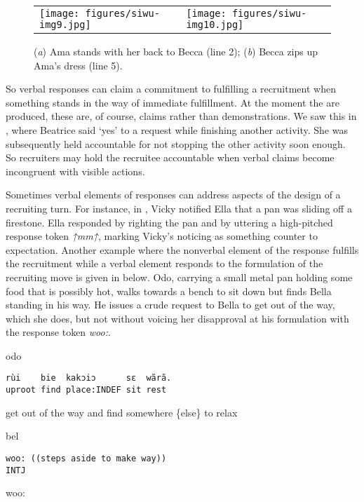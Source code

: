 \documentclass[output=paper]{langsci/langscibook}
\begin{document}
\begin{figure}
\begin{tabularx}{\textwidth}{ll}
\centering
\texttt{[image: figures/siwu-img9.jpg]} & \texttt{[image: figures/siwu-img10.jpg]}
\end{tabularx}
\caption{(\textit{a}) Ama stands with her back to Becca (line 2); (\textit{b}) Becca zips up Ama’s dress (line 5).}
\label{fig:dingemanse:6}
\end{figure}

\normalsize
So verbal responses can claim a commitment to fulfilling a recruitment when something stands in the way of immediate fulfillment. At the moment the are produced, these are, of course, claims rather than demonstrations. We saw this in , where Beatrice said ‘yes’ to a request while finishing another activity. She was subsequently held accountable for not stopping the other activity soon enough. So recruiters may hold the recruitee accountable when verbal claims become incongruent with visible actions.

Sometimes verbal elements of responses can address aspects of the design of a recruiting turn. For instance, in , Vicky notified Ella that a pan was sliding off a firestone. Ella responded by righting the pan and by uttering a high-pitched response token \textit{↑mm↑}, marking Vicky’s noticing as something counter to expectation. Another example where the nonverbal element of the response fulfills the recruitment while a verbal element responds to the formulation of the recruiting move is given in  below. Odo, carrying a small metal pan holding some food that is possibly hot, walks towards a bench to sit down but finds Bella standing in his way. He issues a crude request to Bella to get out of the way, which she does, but not without voicing her disapproval at his formulation with the response token \textit{woo:}.

\vspace{-1mm}
%
\begin{mdframednoverticalspace}[style=firstfoc]
\begin{transbox}{1}{odo}
\begin{verbatim}
rùi    bie  kakɔiɔ      sɛ  wãrã.
uproot find place:INDEF sit rest
\end{verbatim}
get out of the way and find somewhere \{else\} to relax
\end{transbox}
\end{mdframednoverticalspace}
%
\begin{mdframednoverticalspace}[style=secondfoc]
\begin{transbox}{2}{bel}
\begin{verbatim}
woo: ((steps aside to make way))
INTJ
\end{verbatim}
woo:
\end{transbox}
\end{mdframednoverticalspace}
%
\\
\end{document}
